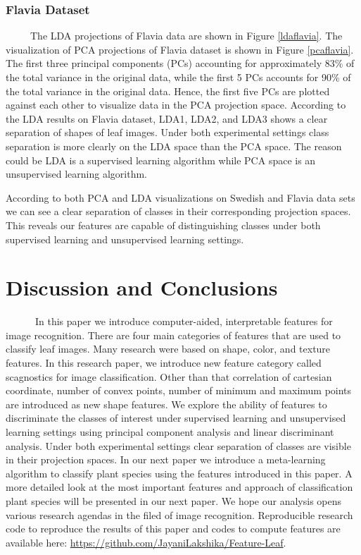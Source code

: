 \documentclass{article}
\begin{document}
\hypertarget{flavia-dataset}{%
\subsubsection{Flavia Dataset}\label{flavia-dataset}}

~~~~~The LDA projections of Flavia data are shown in Figure
\ref{ldaflavia}. The visualization of PCA projections of Flavia dataset
is shown in Figure \ref{pcaflavia}. The first three principal components
(PCs) accounting for approximately 83\% of the total variance in the
original data, while the first 5 PCs accounts for 90\% of the total
variance in the original data. Hence, the first five PCs are plotted
against each other to visualize data in the PCA projection space.
According to the LDA results on Flavia dataset, LDA1, LDA2, and LDA3
shows a clear separation of shapes of leaf images. Under both
experimental settings class separation is more clearly on the LDA space
than the PCA space. The reason could be LDA is a supervised learning
algorithm while PCA space is an unsupervised learning algorithm.

According to both PCA and LDA visualizations on Swedish and Flavia data
sets we can see a clear separation of classes in their corresponding
projection spaces. This reveals our features are capable of
distinguishing classes under both supervised learning and unsupervised
learning settings.

\newpage

\hypertarget{discussion-and-conclusions}{%
\section{Discussion and Conclusions}\label{discussion-and-conclusions}}

~~~~~~In this paper we introduce computer-aided, interpretable features
for image recognition. There are four main categories of features that
are used to classify leaf images. Many research were based on shape,
color, and texture features. In this research paper, we introduce new
feature category called scagnostics for image classification. Other than
that correlation of cartesian coordinate, number of convex points,
number of minimum and maximum points are introduced as new shape
features. We explore the ability of features to discriminate the classes
of interest under supervised learning and unsupervised learning settings
using principal component analysis and linear discriminant analysis.
Under both experimental settings clear separation of classes are visible
in their projection spaces. In our next paper we introduce a
meta-learning algorithm to classify plant species using the features
introduced in this paper. A more detailed look at the most important
features and approach of classification plant species will be presented
in our next paper. We hope our analysis opens various research agendas
in the filed of image recognition. Reproducible research code to
reproduce the results of this paper and codes to compute features are
available here: \url{https://github.com/JayaniLakshika/Feature-Leaf}.
\end{document}
